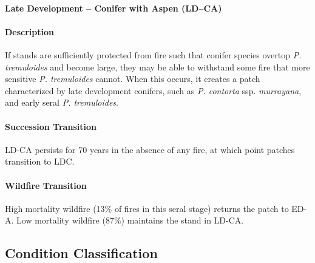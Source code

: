 \noindent\hrulefill


\paragraph{Late Development – Conifer with Aspen (LD–CA)}

\paragraph{Description} If stands are sufficiently protected from fire such that conifer species overtop \emph{P. tremuloides} and become large, they may be able to withstand some fire that more sensitive \emph{P. tremuloides} cannot. When this occurs, it creates a patch characterized by late development conifers, such as \emph{P. contorta} ssp. \emph{murrayana}, and early seral \emph{P. tremuloides}. 

\paragraph{Succession Transition} LD-CA persists for 70 years in the absence of any fire, at which point patches transition to LDC. 

\paragraph{Wildfire Transition} High mortality wildfire (13\% of fires in this seral stage) returns the patch to ED-A. Low mortality wildfire (87\%) maintains the stand in LD-CA. 

\noindent\hrulefill

\subsection*{Condition Classification}

